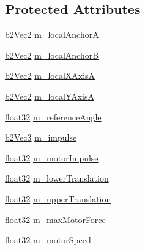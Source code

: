 \subsection*{Protected Attributes}
\begin{DoxyCompactItemize}
\item 
\mbox{\hyperlink{structb2_vec2}{b2\+Vec2}} \mbox{\hyperlink{classb2_prismatic_joint_aeec29d80cc57252702fd645c31ca7889}{m\+\_\+local\+AnchorA}}
\item 
\mbox{\hyperlink{structb2_vec2}{b2\+Vec2}} \mbox{\hyperlink{classb2_prismatic_joint_ae9cb63f225e4b4dcc287ab475868d044}{m\+\_\+local\+AnchorB}}
\item 
\mbox{\hyperlink{structb2_vec2}{b2\+Vec2}} \mbox{\hyperlink{classb2_prismatic_joint_ab68f8bb2a8012e4646dc274db1723fbf}{m\+\_\+local\+X\+AxisA}}
\item 
\mbox{\hyperlink{structb2_vec2}{b2\+Vec2}} \mbox{\hyperlink{classb2_prismatic_joint_a6885a7d60a2596883660183bcf721ea9}{m\+\_\+local\+Y\+AxisA}}
\item 
\mbox{\hyperlink{b2_settings_8h_aacdc525d6f7bddb3ae95d5c311bd06a1}{float32}} \mbox{\hyperlink{classb2_prismatic_joint_ad8b2ee403ba7517966d9e05b988e28c6}{m\+\_\+reference\+Angle}}
\item 
\mbox{\hyperlink{structb2_vec3}{b2\+Vec3}} \mbox{\hyperlink{classb2_prismatic_joint_a92530ae3ec9765d775ec82a39400f770}{m\+\_\+impulse}}
\item 
\mbox{\hyperlink{b2_settings_8h_aacdc525d6f7bddb3ae95d5c311bd06a1}{float32}} \mbox{\hyperlink{classb2_prismatic_joint_aff90d55579b511950334d8a0449f1155}{m\+\_\+motor\+Impulse}}
\item 
\mbox{\hyperlink{b2_settings_8h_aacdc525d6f7bddb3ae95d5c311bd06a1}{float32}} \mbox{\hyperlink{classb2_prismatic_joint_a82e13b09e43d0d82365845aa3fb7f9fe}{m\+\_\+lower\+Translation}}
\item 
\mbox{\hyperlink{b2_settings_8h_aacdc525d6f7bddb3ae95d5c311bd06a1}{float32}} \mbox{\hyperlink{classb2_prismatic_joint_a09a5bbe1ae720f1f4e2b1fd16f8ad613}{m\+\_\+upper\+Translation}}
\item 
\mbox{\hyperlink{b2_settings_8h_aacdc525d6f7bddb3ae95d5c311bd06a1}{float32}} \mbox{\hyperlink{classb2_prismatic_joint_a42685bcbc18ea7a74d75c459a381a7b9}{m\+\_\+max\+Motor\+Force}}
\item 
\mbox{\hyperlink{b2_settings_8h_aacdc525d6f7bddb3ae95d5c311bd06a1}{float32}} \mbox{\hyperlink{classb2_prismatic_joint_a0851a1993e9e4f4103a8f7dbaeedb9c5}{m\+\_\+motor\+Speed}}
\item 

\end{DoxyCompactItemize}
